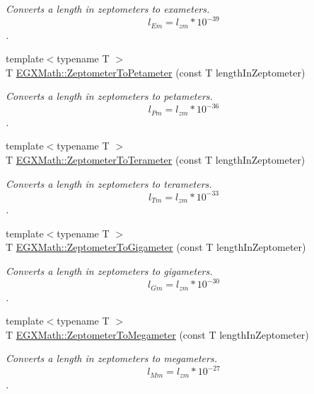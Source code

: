 \begin{DoxyCompactItemize}
\begin{DoxyCompactList}\small\item\em Converts a length in zeptometers to exameters. \[ l_{Em}=l_{zm} * 10^{-39} \]. \end{DoxyCompactList}\item 
{\footnotesize template$<$typename T $>$ }\\T \mbox{\hyperlink{group___e_g_x_math-_conversions-_length_conversions-_s_i-_zeptometer-_s_i_ga8d63077fa2d65649004804647da5af60}{E\+G\+X\+Math\+::\+Zeptometer\+To\+Petameter}} (const T length\+In\+Zeptometer)
\begin{DoxyCompactList}\small\item\em Converts a length in zeptometers to petameters. \[ l_{Pm}=l_{zm} * 10^{-36} \]. \end{DoxyCompactList}\item 
{\footnotesize template$<$typename T $>$ }\\T \mbox{\hyperlink{group___e_g_x_math-_conversions-_length_conversions-_s_i-_zeptometer-_s_i_ga442c02caa8b630c3f90675191b22bca5}{E\+G\+X\+Math\+::\+Zeptometer\+To\+Terameter}} (const T length\+In\+Zeptometer)
\begin{DoxyCompactList}\small\item\em Converts a length in zeptometers to terameters. \[ l_{Tm}=l_{zm} * 10^{-33} \]. \end{DoxyCompactList}\item 
{\footnotesize template$<$typename T $>$ }\\T \mbox{\hyperlink{group___e_g_x_math-_conversions-_length_conversions-_s_i-_zeptometer-_s_i_ga730e0331ec8efc46b557692f5f515d03}{E\+G\+X\+Math\+::\+Zeptometer\+To\+Gigameter}} (const T length\+In\+Zeptometer)
\begin{DoxyCompactList}\small\item\em Converts a length in zeptometers to gigameters. \[ l_{Gm}=l_{zm} * 10^{-30} \]. \end{DoxyCompactList}\item 
{\footnotesize template$<$typename T $>$ }\\T \mbox{\hyperlink{group___e_g_x_math-_conversions-_length_conversions-_s_i-_zeptometer-_s_i_ga53c621beeed03e51c3ad8a5cc267a35f}{E\+G\+X\+Math\+::\+Zeptometer\+To\+Megameter}} (const T length\+In\+Zeptometer)
\begin{DoxyCompactList}\small\item\em Converts a length in zeptometers to megameters. \[ l_{Mm}=l_{zm} * 10^{-27} \]. \end{DoxyCompactList}\item 

\end{DoxyCompactItemize}
